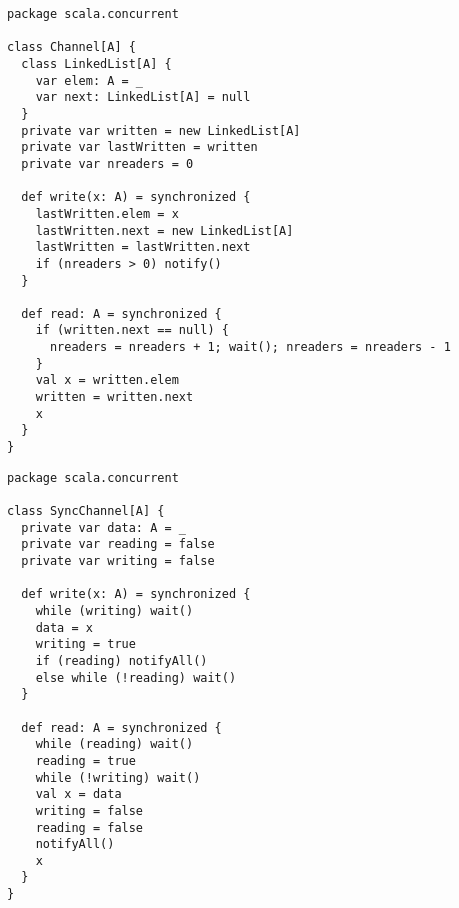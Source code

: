 \begin{itemize}
\begin{lstlisting}
package scala.concurrent

class Channel[A] {
  class LinkedList[A] {
    var elem: A = _
    var next: LinkedList[A] = null
  }
  private var written = new LinkedList[A]
  private var lastWritten = written
  private var nreaders = 0

  def write(x: A) = synchronized {
    lastWritten.elem = x
    lastWritten.next = new LinkedList[A]
    lastWritten = lastWritten.next
    if (nreaders > 0) notify()
  }

  def read: A = synchronized {
    if (written.next == null) {
      nreaders = nreaders + 1; wait(); nreaders = nreaders - 1
    }
    val x = written.elem
    written = written.next
    x
  }
}
\end{lstlisting}


\begin{lstlisting}
package scala.concurrent

class SyncChannel[A] {
  private var data: A = _
  private var reading = false
  private var writing = false

  def write(x: A) = synchronized {
    while (writing) wait()
    data = x
    writing = true
    if (reading) notifyAll()
    else while (!reading) wait()
  }

  def read: A = synchronized {
    while (reading) wait()
    reading = true
    while (!writing) wait()
    val x = data
    writing = false
    reading = false
    notifyAll()
    x
  }
}
\end{lstlisting}



\end{itemize}
